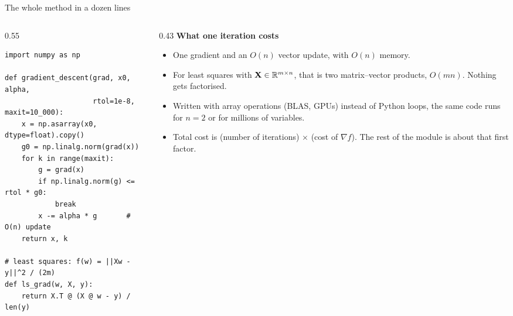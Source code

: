 \begin{frame}[fragile]{The whole method in a dozen lines}
  \begin{columns}[T]
    \begin{column}{0.55\textwidth}
\begin{lstlisting}[style=py]
import numpy as np

def gradient_descent(grad, x0, alpha,
                     rtol=1e-8, maxit=10_000):
    x = np.asarray(x0, dtype=float).copy()
    g0 = np.linalg.norm(grad(x))
    for k in range(maxit):
        g = grad(x)
        if np.linalg.norm(g) <= rtol * g0:
            break
        x -= alpha * g       # O(n) update
    return x, k

# least squares: f(w) = ||Xw - y||^2 / (2m)
def ls_grad(w, X, y):
    return X.T @ (X @ w - y) / len(y)
\end{lstlisting}
    \end{column}
    \begin{column}{0.43\textwidth}
      \small\textbf{What one iteration costs}
      \begin{itemize}\footnotesize
        \item One gradient and an $O(n)$ vector update, with $O(n)$ memory.
        \item For least squares with $\mathbf X\in\mathbb{R}^{m\times n}$, that is two matrix--vector products, $O(mn)$.
              Nothing gets factorised.
        \item Written with array operations (BLAS, GPUs) instead of Python loops, the same code runs for
              $n = 2$ or for millions of variables.
        \item Total cost is (number of iterations) $\times$ (cost of $\nabla f$). The rest of the module is
              about that first factor.
      \end{itemize}
    \end{column}
  \end{columns}
\end{frame}
